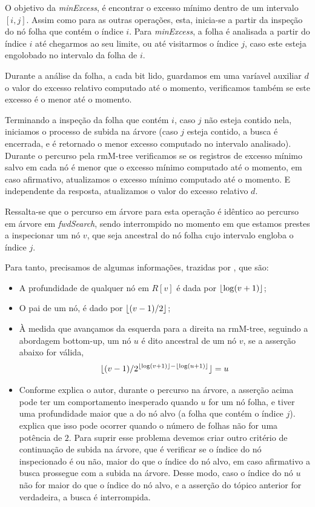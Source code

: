     
    O objetivo da \textit{minExcess}, é encontrar o excesso mínimo dentro de um intervalo $[i, j]$. Assim como para as outras operações, esta, inicia-se a partir da inspeção do nó folha que contém o índice $i$. Para \textit{minExcess}, a folha é analisada a partir do índice $i$ até chegarmos ao seu limite, ou até visitarmos o índice $j$, caso este esteja engolobado no intervalo da folha de $i$. 

    Durante a análise da folha, a cada bit lido, guardamos em uma varíavel auxiliar $d$ o valor do excesso relativo computado até o momento, verificamos também se este excesso é o menor até o momento.

    Terminando a inspeção da folha que contém $i$, caso $j$ não esteja contido nela, iniciamos o processo de subida na árvore (caso $j$ esteja contido, a busca é encerrada, e é retornado o menor excesso computado no intervalo analisado). Durante o percurso pela rmM-tree verificamos se os registros de excesso mínimo salvo em cada nó é menor que o excesso mínimo computado até o momento, em caso afirmativo, atualizamos o excesso mínimo computado até o momento. E independente da resposta, atualizamos o valor do excesso relativo $d$.

    Ressalta-se que o percurso em árvore para esta operação é idêntico ao percurso em árvore em \textit{fwdSearch}, sendo interrompido no momento em que estamos prestes a inspecionar um nó $v$, que seja ancestral do nó folha cujo intervalo engloba o índice $j$.

    Para tanto, precisamos de algumas informações, trazidas por \citet{book-compact-data-structures}, que são:
    \begin{itemize}
        \item A profundidade de qualquer nó em $R[v]$ é dada por $\lfloor\log (v + 1 )\rfloor$;
        \item O pai de um nó, é dado por $\lfloor(v-1)/2\rfloor$;
        \item À medida que avançamos da esquerda para a direita na rmM-tree, seguindo a abordagem bottom-up, um nó $u$ é dito ancestral de um nó $v$, se a asserção abaixo for válida,
        $$\lfloor(v-1)/2^{\lfloor\log (v+1)\rfloor - \lfloor\log (u+1)\rfloor}\rfloor = u$$
        \item Conforme explica o autor, durante o percurso na árvore, a asserção acima pode ter um comportamento inesperado quando  $u$ for um nó folha, e tiver uma profundidade maior que a do nó alvo (a folha que contém o índice $j$). \citet{book-compact-data-structures} explica que isso pode ocorrer quando o número de folhas não for uma potência de $2$. 
        Para suprir esse problema devemos criar outro critério de continuação de subida na árvore, que é verificar se o índice do nó inspecionado é ou não, maior do que o índice do nó alvo, em caso afirmativo a busca prossegue com a subida na árvore. Desse modo, caso o índice do nó $u$ não for maior do que o índice do nó alvo, e a asserção do tópico anterior for verdadeira, a busca é interrompida.
    \end{itemize}



